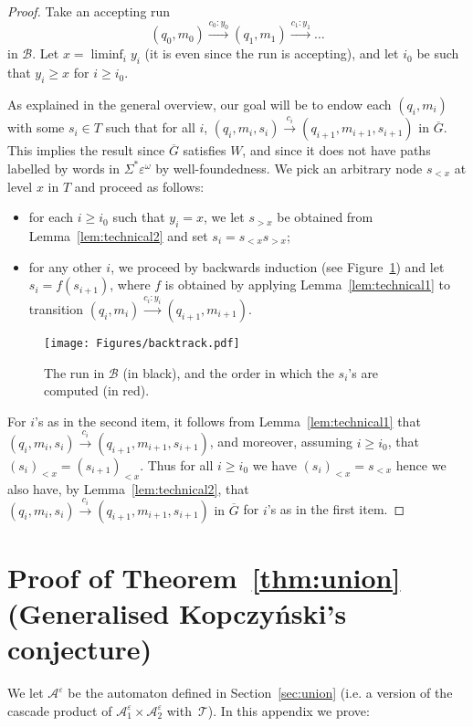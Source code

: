 \documentclass[a4paper,UKenglish,cleveref, thm-restate]{lipics-v2021}
\newcommand\po[1]{\todo[inline,size=\scriptsize,backgroundcolor=pink]{#1 - \textbf{Pierre}}}
\newcommand{\re}[1]{\xrightarrow{#1}}
\newcommand{\tin}{\text{ in }}
\newcommand{\eps}{\varepsilon}
\newcommand{\A}{\mathcal{A}}
\newcommand{\B}{\mathcal B}
\newcommand{\T}{\mathcal T}
\begin{document}
\begin{proof}
    Take an accepting run
    \[
        (q_0,m_0) \re{c_0:y_0} (q_1,m_1) \re{c_1:y_1} \dots
    \]
    in $\B$.
    Let $x=\liminf_i y_i$ (it is even since the run is accepting), and let $i_0$ be such that $y_i \geq x$ for $i \geq i_0$.

    As explained in the general overview, our goal will be to endow each $(q_i,m_i)$ with some $s_i \in T$ such that for all $i$, $(q_i,m_i,s_i) \re{c_i} (q_{i+1},m_{i+1},s_{i+1}) \tin \overline G$.
    This implies the result since $\overline G$ satisfies $W$, and since it does not have paths labelled by words in $\Sigma^* \eps^\omega$ by well-foundedness.
    We pick an arbitrary node $s_{< x}$ at level $x$ in $T$ and proceed as follows:
    \begin{itemize}
        \item for each $i\geq i_0$ such that $y_i = x$, we let $s_{> x}$ be obtained from Lemma~\ref{lem:technical2} and set $s_i = s_{< x} s_{> x}$;
        \item for any other $i$, we proceed by backwards induction (see Figure~\ref{fig:backtrack}) and let $s_i=f(s_{i+1})$, where $f$ is obtained by applying Lemma~\ref{lem:technical1} to transition $(q_i,m_i) \re{c_i:y_i} (q_{i+1},m_{i+1})$.
    \end{itemize}

    \begin{figure}[h]
        \begin{center}
            \texttt{[image: Figures/backtrack.pdf]}
        \end{center}
        \caption{The run in $\B$ (in black), and the order in which the $s_i$'s are computed (in red).}\label{fig:backtrack}
    \end{figure}

    For $i$'s as in the second item, it follows from Lemma~\ref{lem:technical1} that $(q_i,m_i,s_i) \re{c_i} (q_{i+1},m_{i+1},s_{i+1})$, and moreover, assuming $i \geq i_0$, that $(s_i)_{< x} = (s_{i+1})_{< x}$.
    Thus for all $i \geq i_0$ we have $(s_i)_{< x} = s_{< x}$ hence we also have, by Lemma~\ref{lem:technical2}, that $(q_i,m_i,s_i) \re{c_i} (q_{i+1},m_{i+1},s_{i+1}) \tin \overline G$ for $i$'s as in the first item. 
\end{proof}

\po{todo: figure} 

\section{Proof of Theorem~\ref{thm:union} (Generalised Kopczyński's conjecture)}\label{app:unon}
We let $\A^\eps$ be the automaton defined in Section~\ref{sec:union} (i.e. a version of the cascade product of $\A_{1}^\eps \times \A_{2}^\eps$ with~$\T$). In this appendix we prove:
\AepsCompleteUnion*
\end{document}
